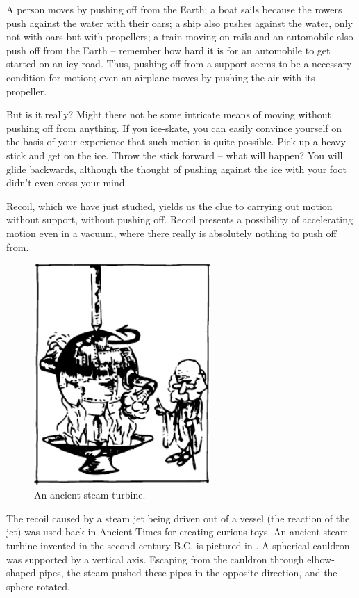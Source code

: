 A person moves by pushing off from the Earth; a boat
sails because the rowers push against the water with their
oars; a ship also pushes against the water, only not with
oars but with propellers; a train moving on rails and an
automobile also push off from the Earth -- remember how
hard it is for an automobile to get started on an icy road.
Thus, pushing off from a support seems to be a necessary
condition for motion; even an airplane moves by pushing
the air with its propeller.


But is it really? Might there not be some intricate
means of moving without pushing off from anything. If
you ice-skate, you can easily convince yourself on the
basis of your experience that such motion is quite possible. Pick up a heavy stick and get on the ice. Throw the stick forward -- what will happen? You will glide backwards, although the thought of pushing against the ice with your foot didn't even cross your mind.

Recoil, which we have just studied, yields us the clue
to carrying out motion without support, without pushing
off. Recoil presents a possibility of accelerating motion
even in a vacuum, where there really is absolutely nothing
to push off from.
\begin{figure}[!ht]
\centering
\includegraphics[width=0.6\textwidth]{figures/fig-03-03.pdf}
\caption{An ancient steam turbine.}
\label{fig-3.03}
\end{figure}

The recoil caused by a steam jet being driven out of
a vessel (the reaction of the jet) was used back in Ancient
Times for creating curious toys. An ancient steam turbine
invented in the second century B.C. is pictured in . A spherical cauldron was supported by a vertical axis. Escaping from the cauldron through elbow-shaped pipes, the steam pushed these pipes in the opposite direction, and the sphere rotated.

